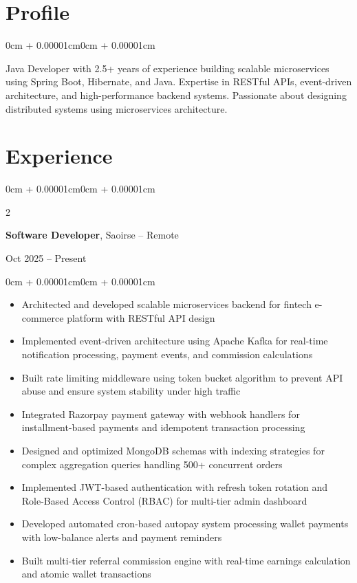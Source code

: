 \documentclass[11pt, letterpaper]{article}
\newenvironment{highlights}{
    \begin{itemize}[topsep=0.05cm, parsep=0.05cm, partopsep=0pt, itemsep=0pt, leftmargin=0cm + 8pt]
}{
    \end{itemize}
}
\newenvironment{onecolentry}{
    \begin{adjustwidth}{0cm + 0.00001cm}{0cm + 0.00001cm}
}{
    \end{adjustwidth}
}
\newenvironment{twocolentry}[2][]{
    \onecolentry
    \def\secondColumn{#2}
    \setcolumnwidth{\fill, 4.2cm}
    \begin{paracol}{2}
}{
    \switchcolumn \raggedleft \secondColumn
    \end{paracol}
    \endonecolentry
}
\begin{document}
    \section{Profile}
    \begin{onecolentry}
        Java Developer with 2.5+ years of experience building scalable microservices using Spring Boot, Hibernate, and Java. Expertise in RESTful APIs, event-driven architecture, and high-performance backend systems. Passionate about designing distributed systems using microservices architecture.
    \end{onecolentry}

    \section{Experience}

    \begin{twocolentry}{Oct 2025 – Present}
        \textbf{Software Developer}, Saoirse -- Remote
    \end{twocolentry}

    \vspace{0.05cm}
    \begin{onecolentry}
      \begin{highlights}
        \item Architected and developed scalable microservices backend for fintech e-commerce platform with RESTful API design
        \item Implemented event-driven architecture using Apache Kafka for real-time notification processing, payment events, and commission calculations
        \item Built rate limiting middleware using token bucket algorithm to prevent API abuse and ensure system stability under high traffic
        \item Integrated Razorpay payment gateway with webhook handlers for installment-based payments and idempotent transaction processing
        \item Designed and optimized MongoDB schemas with indexing strategies for complex aggregation queries handling 500+ concurrent orders
        \item Implemented JWT-based authentication with refresh token rotation and Role-Based Access Control (RBAC) for multi-tier admin dashboard
        \item Developed automated cron-based autopay system processing wallet payments with low-balance alerts and payment reminders
        \item Built multi-tier referral commission engine with real-time earnings calculation and atomic wallet transactions
    \end{highlights}
    \end{onecolentry}
\end{document}
